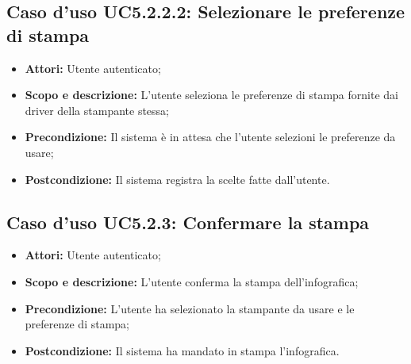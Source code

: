 			\subsection{Caso d'uso UC5.2.2.2: Selezionare le preferenze di stampa}
			\begin{itemize}
				\item \textbf{Attori:} Utente autenticato;
				\item \textbf{Scopo e descrizione:} L'utente seleziona le preferenze di stampa fornite dai driver della stampante stessa;
				\item \textbf{Precondizione:} Il sistema è in attesa che l'utente selezioni le preferenze da usare;
				\item \textbf{Postcondizione:} Il sistema registra la scelte fatte dall'utente.
			\end{itemize}
		
		\subsection{Caso d'uso UC5.2.3: Confermare la stampa}
		\begin{itemize}
			\item \textbf{Attori:} Utente autenticato;
			\item \textbf{Scopo e descrizione:} L'utente conferma la stampa dell'infografica;
			\item \textbf{Precondizione:} L'utente ha selezionato la stampante da usare e le preferenze di stampa;
			\item \textbf{Postcondizione:} Il sistema ha mandato in stampa l'infografica.
		\end{itemize}